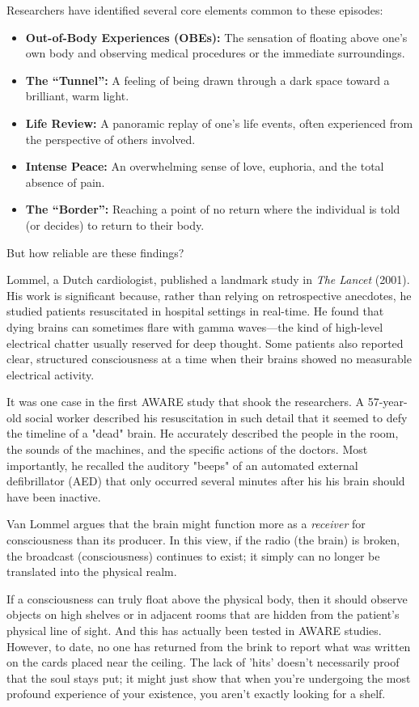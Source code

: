 Researchers have identified several core elements common to these episodes:

\begin{itemize}
\item \textbf{Out-of-Body Experiences (OBEs):} The sensation of floating above one’s own body and observing medical procedures or the immediate surroundings.
\item \textbf{The ``Tunnel'':} A feeling of being drawn through a dark space toward a brilliant, warm light.
\item \textbf{Life Review:} A panoramic replay of one’s life events, often experienced from the perspective of others involved.
\item \textbf{Intense Peace:} An overwhelming sense of love, euphoria, and the total absence of pain.
\item \textbf{The ``Border'':} Reaching a point of no return where the individual is told (or decides) to return to their body.
\end{itemize}

But how reliable are these findings?

Lommel, a Dutch cardiologist, published a landmark study in \emph{The Lancet} (2001).
His work is significant because, rather than relying on retrospective anecdotes, he studied patients resuscitated in hospital settings in real-time.
He found that dying brains can sometimes flare with gamma waves—the kind of high-level electrical chatter usually reserved for deep thought. 
Some patients also reported clear, structured consciousness at a time when their brains showed no measurable electrical activity.

It was one case in the first AWARE study that shook the researchers. A 57-year-old social worker described his resuscitation in such detail that it seemed
to defy the timeline of a "dead" brain. He accurately described the people in the room, the sounds of the machines, and the specific actions of the doctors.
Most importantly, he recalled the auditory "beeps" of an automated external defibrillator (AED) that only occurred several minutes after his
his brain should have been inactive.

Van Lommel argues that the brain might function more as a \emph{receiver} for consciousness than its producer.
In this view, if the radio (the brain) is broken, the broadcast (consciousness) continues to exist; it simply can no longer be translated into the physical realm.

If a consciousness can truly float above the physical body, then it should observe objects on high
shelves or in adjacent rooms that are hidden from the patient's physical line of sight. And this has actually been tested in AWARE studies. 
However, to date, no one has returned from the brink to report what was written on the cards placed near the ceiling.
The lack of 'hits' doesn't necessarily proof that the soul stays put; it might just show that when you’re undergoing the most profound experience of your existence, you aren't exactly looking for a shelf.

